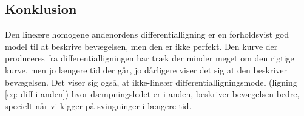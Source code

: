 \subsection{Konklusion}
Den lineære homogene andenordens differentialligning er en forholdsvist god model til at beskrive bevægelsen, men den er ikke perfekt. 
Den kurve der produceres fra differentialligningen har træk der minder meget om den rigtige kurve, men jo længere tid der går, jo dårligere viser det sig at den beskriver bevægelsen. 
Det viser sig også, at ikke-lineær differentialligningsmodel (ligning \ref{eq: diff i anden}) hvor dæmpningsledet er i anden, beskriver bevægelsen bedre, specielt når vi kigger på svingninger i længere tid.


